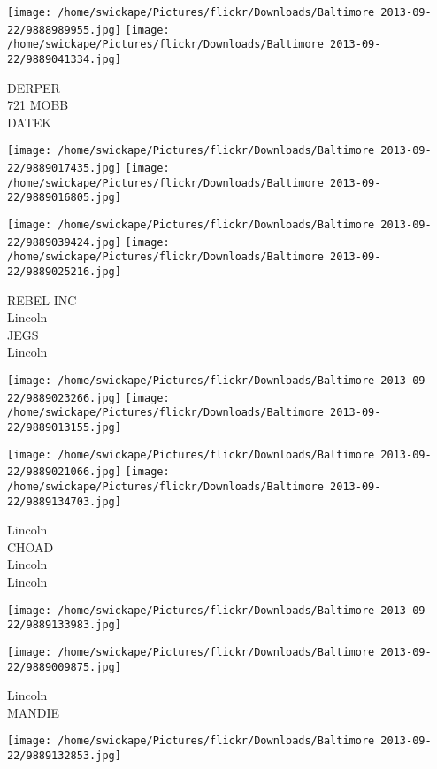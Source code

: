 \documentclass[10pt,letterpaper]{article}
\begin{document}
\vspace{0.25in}
\texttt{[image: /home/swickape/Pictures/flickr/Downloads/Baltimore 2013-09-22/9888989955.jpg]}
\texttt{[image: /home/swickape/Pictures/flickr/Downloads/Baltimore 2013-09-22/9889041334.jpg]}

DERPER\\
721 MOBB\\
DATEK\\
\pagebreak

\texttt{[image: /home/swickape/Pictures/flickr/Downloads/Baltimore 2013-09-22/9889017435.jpg]}
\texttt{[image: /home/swickape/Pictures/flickr/Downloads/Baltimore 2013-09-22/9889016805.jpg]}

\texttt{[image: /home/swickape/Pictures/flickr/Downloads/Baltimore 2013-09-22/9889039424.jpg]}
\texttt{[image: /home/swickape/Pictures/flickr/Downloads/Baltimore 2013-09-22/9889025216.jpg]}

REBEL INC\\
Lincoln\\
JEGS\\
Lincoln\\
\pagebreak

\texttt{[image: /home/swickape/Pictures/flickr/Downloads/Baltimore 2013-09-22/9889023266.jpg]}
\texttt{[image: /home/swickape/Pictures/flickr/Downloads/Baltimore 2013-09-22/9889013155.jpg]}

\texttt{[image: /home/swickape/Pictures/flickr/Downloads/Baltimore 2013-09-22/9889021066.jpg]}
\texttt{[image: /home/swickape/Pictures/flickr/Downloads/Baltimore 2013-09-22/9889134703.jpg]}

Lincoln\\
CHOAD\\
Lincoln\\
Lincoln\\
\pagebreak

\texttt{[image: /home/swickape/Pictures/flickr/Downloads/Baltimore 2013-09-22/9889133983.jpg]}

\vspace{0.25in}
\texttt{[image: /home/swickape/Pictures/flickr/Downloads/Baltimore 2013-09-22/9889009875.jpg]}

Lincoln\\
MANDIE\\
\pagebreak

\texttt{[image: /home/swickape/Pictures/flickr/Downloads/Baltimore 2013-09-22/9889132853.jpg]}
\end{document}
